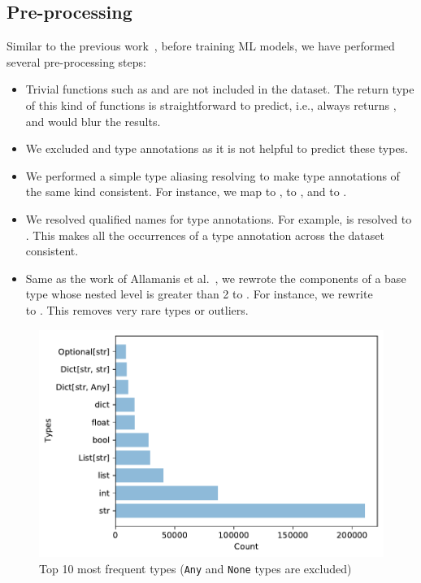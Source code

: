 \subsection{Pre-processing}
Similar to the previous work~\cite{pradel2019typewriter, allamanis2020typilus}, before training ML models, we have performed several pre-processing steps:

\begin{itemize}
	\item Trivial functions such as  and  are not included in the dataset. The return type of this kind of functions is straightforward to predict, i.e.,  always returns , and would blur the results.
	\item We excluded  and  type annotations as it is not helpful to predict these types.
	\item We performed a simple type aliasing resolving to make type annotations of the same kind consistent. For instance, we map \code{[]} to , \code{\{\}} to , and  to .
	\item We resolved qualified names for type annotations. For example,  is resolved to . This makes all the occurrences of a type annotation across the dataset consistent.
	\item Same as the work of Allamanis et al.~\cite{allamanis2020typilus}, we rewrote the components of a base type whose nested level is greater than 2 to . For instance, we rewrite \\  to \code{List[List[Any]]]}. This removes very rare types or outliers.
\end{itemize}

\begin{figure}[!t]
	\centering
	\includegraphics[width=\linewidth]{chapters/ch4/figs/top-10-most-frequent-types.pdf}
	\caption{Top 10 most frequent types (\texttt{Any} and \texttt{None} types are excluded)}
	\label{ch4:fig:top_10_types}
\end{figure}

